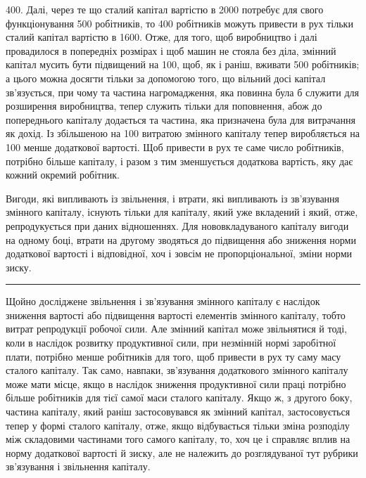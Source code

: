 \parcont{}  %
400. Далі, через те що сталий капітал вартістю в 2000 потребує
для свого функціонування 500 робітників, то 400 робітників можуть привести в рух тільки сталий
капітал вартістю в 1600. Отже,
для того, щоб виробництво і далі провадилося в попередніх
розмірах і щоб  машин не стояла без діла, змінний капітал
мусить бути підвищений на 100, щоб, як і раніш, вживати 500 робітників; а цього
можна досягти тільки за
допомогою того, що вільний досі капітал зв’язується, при чому
та частина нагромадження, яка повинна була б служити для розширення виробництва, тепер служить
тільки для поповнення, абож
до попереднього капіталу додається та частина, яка призначена
була для витрачання як дохід. Із збільшеною на 100 витратою змінного капіталу тепер виробляється на
100 менше додаткової вартості. Щоб привести
в рух те саме число робітників, потрібно більше капіталу, і разом
з тим зменшується додаткова вартість, яку дає кожний окремий робітник.

Вигоди, які випливають із звільнення, і втрати, які випливають із зв’язування змінного капіталу,
існують тільки для капіталу, який уже вкладений і який, отже, репродукується при даних відношеннях.
Для нововкладуваного капіталу вигоди на
одному боці, втрати на другому зводяться до підвищення або
зниження норми додаткової вартості і відповідної, хоч і зовсім
не пропорціональної, зміни норми зиску.

\pfbreak

Щойно досліджене звільнення і зв’язування змінного капіталу є наслідок зниження вартості або
підвищення вартості
елементів змінного капіталу, тобто витрат репродукції робочої
сили. Але змінний капітал може звільнятися й тоді, коли в наслідок розвитку продуктивної сили, при
незмінній нормі заробітної плати, потрібно менше робітників для того, щоб привести
в рух ту саму масу сталого капіталу. Так само, навпаки, зв’язування додаткового змінного капіталу
може мати місце, якщо
в наслідок зниження продуктивної сили праці потрібно більше
робітників для тієї самої маси сталого капіталу. Якщо ж, з другого боку, частина капіталу, який
раніш застосовувався як змінний капітал, застосовується тепер у формі сталого капіталу, отже, якщо
відбувається тільки зміна розподілу між складовими
частинами того самого капіталу, то, хоч це і справляє вплив
на норму додаткової вартості й зиску, але не належить до розглядуваної тут рубрики зв’язування і
звільнення капіталу.

